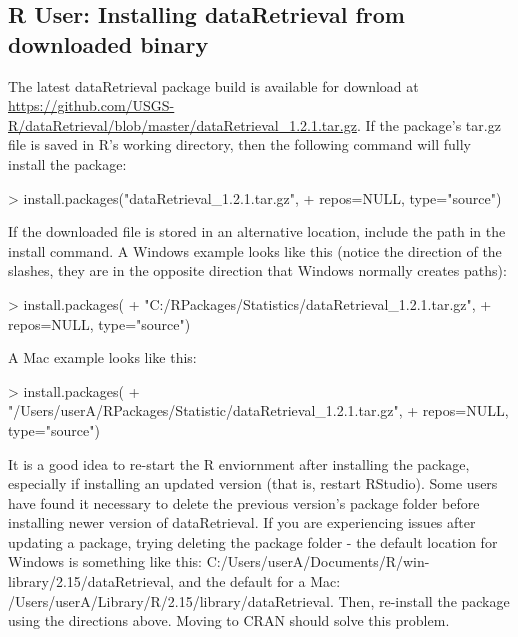 \documentclass[a4paper,11pt]{article}
\begin{document}
\subsection{R User: Installing dataRetrieval from downloaded binary}
The latest dataRetrieval package build is available for download at \url{https://github.com/USGS-R/dataRetrieval/blob/master/dataRetrieval_1.2.1.tar.gz}.  If the package's tar.gz file is saved in R's working directory, then the following command will fully install the package:

\begin{Schunk}
\begin{Sinput}
> install.packages("dataRetrieval_1.2.1.tar.gz", 
+                  repos=NULL, type="source")
\end{Sinput}
\end{Schunk}

If the downloaded file is stored in an alternative location, include the path in the install command.  A Windows example looks like this (notice the direction of the slashes, they are in the opposite direction that Windows normally creates paths):

\begin{Schunk}
\begin{Sinput}
> install.packages(
+   "C:/RPackages/Statistics/dataRetrieval_1.2.1.tar.gz", 
+   repos=NULL, type="source")
\end{Sinput}
\end{Schunk}

A Mac example looks like this:

\begin{Schunk}
\begin{Sinput}
> install.packages(
+   "/Users/userA/RPackages/Statistic/dataRetrieval_1.2.1.tar.gz", 
+   repos=NULL, type="source")
\end{Sinput}
\end{Schunk}

It is a good idea to re-start the R enviornment after installing the package, especially if installing an updated version (that is, restart RStudio). Some users have found it necessary to delete the previous version's package folder before installing newer version of dataRetrieval. If you are experiencing issues after updating a package, trying deleting the package folder - the default location for Windows is something like this: C:/Users/userA/Documents/R/win-library/2.15/dataRetrieval, and the default for a Mac: /Users/userA/Library/R/2.15/library/dataRetrieval. Then, re-install the package using the directions above. Moving to CRAN should solve this problem.
\end{document}
